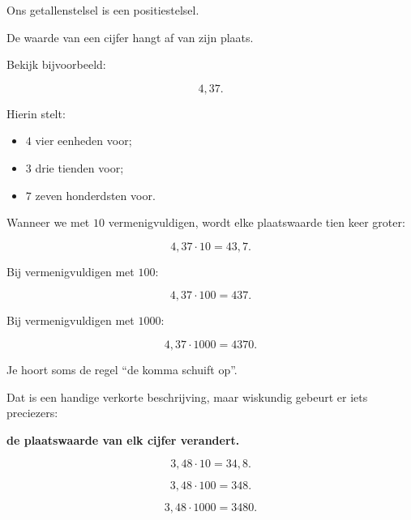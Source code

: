 \documentclass{ximera}
\begin{document}

Ons getallenstelsel is een positiestelsel.

De waarde van een cijfer hangt af van zijn plaats.

Bekijk bijvoorbeeld:

\[
4{,}37.
\]

Hierin stelt:

\begin{itemize}
    \item \(4\) vier eenheden voor;
    \item \(3\) drie tienden voor;
    \item \(7\) zeven honderdsten voor.
\end{itemize}

Wanneer we met \(10\) vermenigvuldigen, wordt elke plaatswaarde tien keer
groter:

\[
4{,}37\cdot10=43{,}7.
\]

Bij vermenigvuldigen met \(100\):

\[
4{,}37\cdot100=437.
\]

Bij vermenigvuldigen met \(1000\):

\[
4{,}37\cdot1000=4370.
\]

Je hoort soms de regel ``de komma schuift op''.

Dat is een handige verkorte beschrijving, maar wiskundig gebeurt er iets
preciezers:

\begin{center}
\textbf{de plaatswaarde van elk cijfer verandert.}
\end{center}




\begin{voorbeeld}

\[
3{,}48\cdot10=34{,}8.
\]

\[
3{,}48\cdot100=348.
\]

\[
3{,}48\cdot1000=3480.
\]

\end{voorbeeld}
\end{document}
